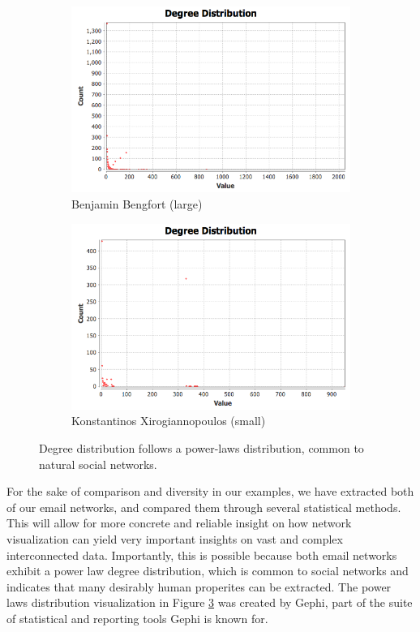 \documentclass[11pt,letterpaper]{article}
\begin{document}
\begin{figure}[h]
	\centering
	\begin{subfigure}{0.49\textwidth}
		\centering
		\includegraphics[width=\textwidth]{figures/benjamin_degree.png}
		\caption{\textsf{Benjamin Bengfort (large)}}
        \label{fig:benjamin_degree}
	\end{subfigure} \hfill
	\begin{subfigure}{0.49\textwidth}
		\centering
		\includegraphics[width=\textwidth]{figures/kostas_degree.png}
		\caption{\textsf{Konstantinos Xirogiannopoulos (small)}}
        \label{fig:kostas_degree}
	\end{subfigure}
    \caption{\textsf{Degree distribution follows a power-laws distribution, common to natural social networks.}}
    \label{fig:degree}
\end{figure}

For the sake of comparison and diversity in our examples, we have extracted both of our email networks, and compared them through several statistical methods. This will allow for more concrete and reliable insight on how network visualization can yield very important insights on vast and complex interconnected data. Importantly, this is possible because both email networks exhibit a power law degree distribution, which is common to social networks and indicates that many desirably human properites can be extracted. The power laws distribution visualization in Figure \ref{fig:degree} was created by Gephi, part of the suite of statistical and reporting tools Gephi is known for.
\end{document}

